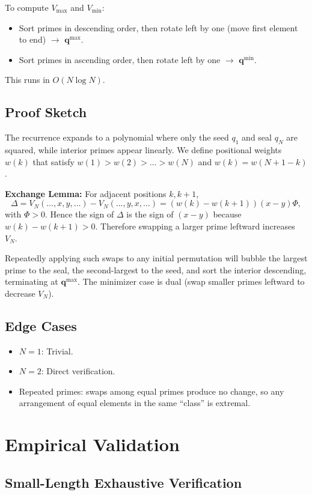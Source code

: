 \documentclass[12pt]{article}
\theoremstyle{plain}
\theoremstyle{definition}
\theoremstyle{remark}
\begin{document}
To compute $V_{\max}$ and $V_{\min}$:
\begin{itemize}
\item Sort primes in descending order, then rotate left by one (move first element to end) $\rightarrow$ $\mathbf{q}^{\max}$.
\item Sort primes in ascending order, then rotate left by one $\rightarrow$ $\mathbf{q}^{\min}$.
\end{itemize}
This runs in $O(N \log N)$.

\subsection{Proof Sketch}

The recurrence expands to a polynomial where only the seed $q_1$ and seal $q_N$ are squared, while interior primes appear linearly. We define positional weights $w(k)$ that satisfy $w(1) > w(2) > \dots > w(N)$ and $w(k) = w(N+1-k)$.

\textbf{Exchange Lemma:} For adjacent positions $k, k+1$,
\[
\Delta = V_N(\dots, x, y, \dots) - V_N(\dots, y, x, \dots) = (w(k)-w(k+1))(x-y)\Phi,
\]
with $\Phi > 0$. Hence the sign of $\Delta$ is the sign of $(x-y)$ because $w(k)-w(k+1) > 0$. Therefore swapping a larger prime leftward increases $V_N$.

Repeatedly applying such swaps to any initial permutation will bubble the largest prime to the seal, the second-largest to the seed, and sort the interior descending, terminating at $\mathbf{q}^{\max}$. The minimizer case is dual (swap smaller primes leftward to decrease $V_N$).

\subsection{Edge Cases}
\begin{itemize}
\item $N=1$: Trivial.
\item $N=2$: Direct verification.
\item Repeated primes: swaps among equal primes produce no change, so any arrangement of equal elements in the same “class” is extremal.
\end{itemize}

\section{Empirical Validation}

\subsection{Small-Length Exhaustive Verification}
\end{document}
